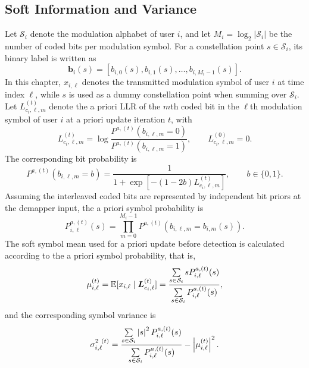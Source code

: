 \subsection{Soft Information and Variance}

Let $\mathcal{S}_i$ denote the modulation alphabet of user $i$, and let
$M_i=\log_2|\mathcal{S}_i|$ be the number of coded bits per modulation symbol. For a constellation point
$s\in\mathcal{S}_i$, its binary label is written as
\begin{equation}
    \bm{b}_i(s)
    =
    [b_{i,0}(s),b_{i,1}(s),\ldots,b_{i,M_i-1}(s)] .
\end{equation}
In this chapter, $x_{i,\ell}$ denotes the transmitted modulation symbol of user $i$ at time index $\ell$, while $s$ is used as a dummy constellation point when summing over $\mathcal{S}_i$.
Let $L^{(t)}_{c_i,\ell,m}$ denote the a priori LLR of the $m$th coded bit in the $\ell$th modulation symbol of user $i$ at a priori update iteration $t$, with
\begin{equation}
    \label{eq:a priori LLR}
    L^{(t)}_{c_i,\ell,m}
    =
    \log
    \frac{P^{a,(t)}(b_{i,\ell,m}=0)}
    {P^{a,(t)}(b_{i,\ell,m}=1)},
    \qquad
    L^{(0)}_{c_i,\ell,m}=0 .
\end{equation}
The corresponding bit probability is
\begin{equation}
    P^{a,(t)}(b_{i,\ell,m}=b)
    =
    \frac{1}
    {1+\exp\left[-(1-2b)L^{(t)}_{c_i,\ell,m}\right]},
    \qquad b\in\{0,1\}.
    \label{eq:bit-prior-from-llr}
\end{equation}
Assuming the interleaved coded bits are represented by independent bit priors at the demapper input, the a priori symbol probability is
\begin{equation}
    P^{a,(t)}_{i,\ell}(s)
    =
    \prod_{m=0}^{M_i-1}
    P^{a,(t)}(b_{i,\ell,m}=b_{i,m}(s)).
    \label{eq:symbol-prior-from-bit-priors}
\end{equation}
The soft symbol mean used for a priori update before detection is calculated according to the a priori symbol probability, that is,
\begin{equation}
    \mu^{(t)}_{i,\ell}
    =
    \mathbb{E}[x_{i,\ell}\mid \bm{L}^{(t)}_{c_i,\ell}]
    =
    \frac{
    \sum\limits_{s\in\mathcal{S}_i}
    s P^{a,(t)}_{i,\ell}(s)}
    {\sum\limits_{s\in\mathcal{S}_i}
    P^{a,(t)}_{i,\ell}(s)} ,
    \label{eq:idd-general-soft-mean}
\end{equation}
and the corresponding symbol variance is
\begin{equation}
    \sigma^{2~(t)}_{i,\ell}
    =
    \frac{
    \sum\limits_{s\in\mathcal{S}_i}
    \left\lvert s \right\rvert^2 P^{a,(t)}_{i,\ell}(s)}
    {\sum\limits_{s\in\mathcal{S}_i}
    P^{a,(t)}_{i,\ell}(s)}
    -
    \left\lvert \mu^{(t)}_{i,\ell} \right\rvert^2 .
    \label{eq:idd-general-soft-var}
\end{equation}
